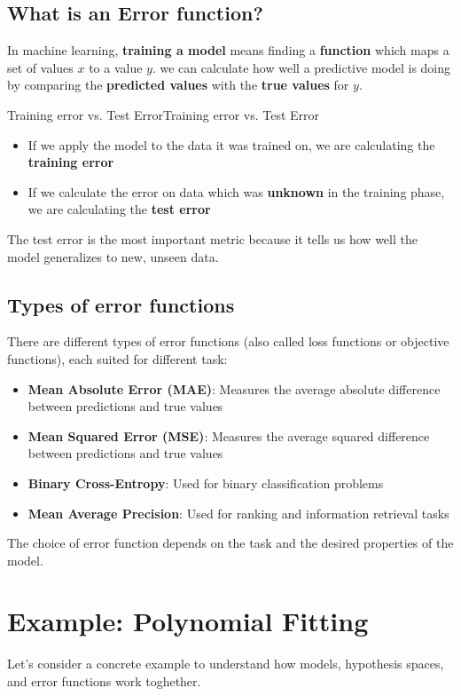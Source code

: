 \documentclass[a4paper]{article}
\theoremstyle{definition}
\begin{document}
\subsection{What is an Error function?}
In machine learning, \textbf{training a model} means finding a \textbf{function} which maps a set of values \( x \) to 
a value \( y \). we can calculate how well a predictive model is doing by comparing the \textbf{predicted values} with the \textbf{true values}
for \( y \).
\begin{definition}{Training error vs. Test Error}{Training error vs. Test Error}
\begin{itemize}
    \item If we apply the model to the data it was trained on, we are calculating the \textbf{training error}
    \item If we calculate the error on data which was \textbf{unknown} in the training phase, we are calculating the \textbf{test error}
\end{itemize}
The test error is the most important metric because it tells us how well the model generalizes 
to new, unseen data.
\end{definition}
\subsection{Types of error functions}
There are different types of error functions (also called loss functions or objective functions), each suited for different task:
\begin{itemize}
    \item \textbf{Mean Absolute Error (MAE)}: Measures the average absolute difference between predictions and true values 
    \item \textbf{Mean Squared Error (MSE)}: Measures the average squared difference between predictions and true values 
    \item \textbf{Binary Cross-Entropy}: Used for binary classification problems
    \item \textbf{Mean Average Precision}: Used for ranking and information retrieval tasks
\end{itemize}
The choice of error function depends on the task and the desired properties of the model.
\section{Example: Polynomial Fitting}
Let's consider a concrete example to understand how models, hypothesis spaces, and error functions work toghether.
\end{document}
